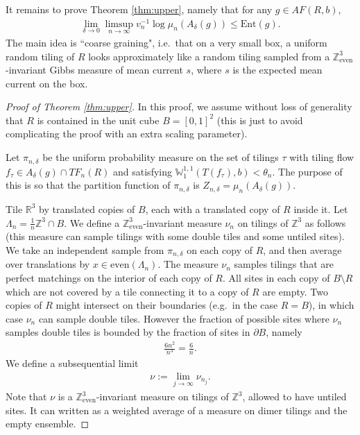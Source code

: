 \documentclass[11pt]{article}
\theoremstyle{remark}
\theoremstyle{definition}
\newcommand{\Z}{\mathbb{Z}}
\newcommand{\Ent}{\text{Ent}}
\newcommand{\threeeven}{\Z^3_{\text{even}}}
\newcommand{\m}[1]{\mathbb{#1}}
\begin{document}
It remains to prove Theorem \ref{thm:upper}, namely that for any $ g\in AF(R, b)$,
\begin{align*}
   \lim_{\delta\to 0}\limsup_{n\to \infty} v_n^{-1} \log \mu_n(A_{\delta}( g)) \leq \Ent( g).
\end{align*}
The main idea is ``coarse graining", i.e.\ that on a very small box, a uniform random tiling of $R$ looks approximately like a random tiling sampled from a $\threeeven$-invariant Gibbs measure of mean current $s$, where $s$ is the expected mean current on the box. 

\begin{proof}[Proof of Theorem \ref{thm:upper}]
In this proof, we assume without loss of generality that $R$ is contained in the unit cube $B = [0,1]^2$ (this is just to avoid complicating the proof with an extra scaling parameter).

Let $\pi_{n,\delta}$ be the uniform probability measure on the set of tilings $\tau$ with tiling flow $f_\tau\in A_\delta(g) \cap TF_n(R)$ and satisfying $\m W_1^{1,1}(T(f_\tau),b)<\theta_n$. The purpose of this is so that the partition function of $\pi_{n,\delta}$ is $Z_{n,\delta} = \mu_{n}(A_\delta(g))$. 

Tile $\m R^3$ by translated copies of $B$, each with a translated copy of $R$ inside it. Let $\Lambda_n = \frac{1}{n} \m Z^3 \cap B $. We define a $\threeeven$-invariant measure $\nu_n$ on tilings of $\m Z^3$ as follows (this measure can sample tilings with some double tiles and some untiled sites). We take an independent sample from $\pi_{n,\delta}$ on each copy of $R$, and then average over translations by $x\in \text{even}(\Lambda_n)$. The measure $\nu_n$ samples tilings that are perfect matchings on the interior of each copy of $R$. All sites in each copy of $B\setminus R$ which are not covered by a tile connecting it to a copy of $R$ are empty. Two copies of $R$ might intersect on their boundaries (e.g.\ in the case $R= B$), in which case $\nu_n$ can sample double tiles. However the fraction of possible sites where $\nu_n$ samples double tiles is bounded by the fraction of sites in $\partial B$, namely
\begin{align*}
    \frac{6n^2}{ n^3} = \frac{6}{n}.
\end{align*}
We define a subsequential limit
\begin{align*}
    \nu:= \lim_{j\to \infty} \nu_{n_j}.
\end{align*}
Note that $\nu$ is a $\threeeven$-invariant measure on tilings of $\m Z^3$, allowed to have untiled sites. It can written as a weighted average of a measure on dimer tilings and the empty ensemble. 


\end{proof}
\end{document}
